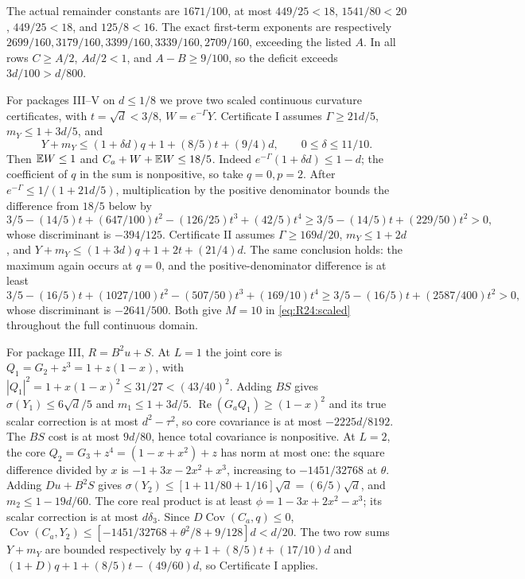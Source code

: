 The actual remainder constants are
$1671/100$, at most $449/25<18$, $1541/80<20$,
$449/25<18$, and $125/8<16$.
The exact first-term exponents are respectively
$2699/160,\allowbreak 3179/160,\allowbreak 3399/160,\allowbreak 3339/160,\allowbreak 2709/160$, exceeding the listed
$A$. In all rows $C\ge A/2$, $Ad/2<1$, and $A-B\ge9/100$,
so the deficit exceeds $3d/100>d/800$.

For packages III--V on $d\le1/8$ we prove two scaled continuous
curvature certificates, with $t=\sqrt d<3/8$, $W=e^{-\Gamma}Y$.
Certificate I assumes $\Gamma\ge21d/5$, $m_Y\le1+3d/5$, and
\[
Y+m_Y\le(1+\delta d)q+1+(8/5)t+(9/4)d,
\qquad0\le\delta\le11/10.
\]
Then $\mathbb E W\le1$ and $C_a+W+\mathbb E W\le18/5$.
Indeed $e^{-\Gamma}(1+\delta d)\le1-d$; the coefficient of $q$
in the sum is nonpositive, so take $q=0,p=2$.
After $e^{-\Gamma}\le1/(1+21d/5)$, multiplication by the positive
denominator bounds the difference from $18/5$ below by
\[
3/5-(14/5)t+(647/100)t^2-(126/25)t^3+(42/5)t^4
\ge3/5-(14/5)t+(229/50)t^2>0,
\]
whose discriminant is $-394/125$.
Certificate II assumes $\Gamma\ge169d/20$, $m_Y\le1+2d$, and
$Y+m_Y\le(1+3d)q+1+2t+(21/4)d$.
The same conclusion holds: the maximum again occurs at $q=0$, and
the positive-denominator difference is at least
\[
3/5-(16/5)t+(1027/100)t^2-(507/50)t^3+(169/10)t^4
\ge3/5-(16/5)t+(2587/400)t^2>0,
\]
whose discriminant is $-2641/500$. Both give $M=10$ in
\eqref{eq:R24:scaled} throughout the full continuous domain.

For package III, $R=B^2u+S$.
At $L=1$ the joint core is $Q_1=G_2+z^3=1+z(1-x)$,
with $|Q_1|^2=1+x(1-x)^2\le31/27<(43/40)^2$.
Adding $BS$ gives $\sigma(Y_1)\le6\sqrt d/5$ and
$m_1\le1+3d/5$.
$\operatorname{Re}(G_aQ_1)\ge(1-x)^2$ and its true scalar
correction is at most $d^2-\tau^2$, so core covariance is at most
$-2225d/8192$. The $BS$ cost is at most $9d/80$, hence total
covariance is nonpositive.
At $L=2$, the core $Q_2=G_3+z^4=(1-x+x^2)+z$ has norm at most
one: the square difference divided by $x$ is
$-1+3x-2x^2+x^3$, increasing to $-1451/32768$ at $\theta$.
Adding $Du+B^2S$ gives $\sigma(Y_2)\le[1+11/80+1/16]\sqrt d
=(6/5)\sqrt d$, and $m_2\le1-19d/60$.
The core real product is at least $\phi=1-3x+2x^2-x^3$;
its scalar correction is at most $d\delta_3$.
Since $D\operatorname{Cov}(C_a,q)\le0$,
$\operatorname{Cov}(C_a,Y_2)
\le[-1451/32768+\theta^2/8+9/128]d<d/20$.
The two row sums $Y+m_Y$ are bounded respectively by
$q+1+(8/5)t+(17/10)d$ and
$(1+D)q+1+(8/5)t-(49/60)d$, so Certificate I applies.

